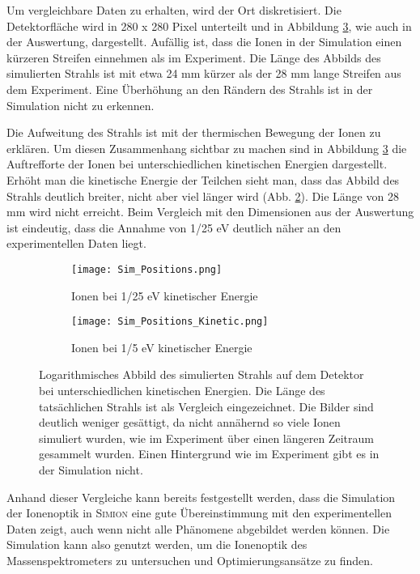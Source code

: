 Um vergleichbare Daten zu erhalten, wird der Ort diskretisiert. Die Detektorfläche wird in 280 x 280 Pixel unterteilt und in Abbildung \ref{fig:sim_pos_both}, wie auch in der Auswertung, dargestellt. Aufällig ist, dass die Ionen in der Simulation einen kürzeren Streifen einnehmen als im Experiment. Die Länge des Abbilds des simulierten Strahls ist mit etwa 24 mm kürzer als der 28 mm lange Streifen aus dem Experiment. Eine Überhöhung an den Rändern des Strahls ist in der Simulation nicht zu erkennen.

Die Aufweitung des Strahls ist mit der thermischen Bewegung der Ionen zu erklären. Um diesen Zusammenhang sichtbar zu machen sind in Abbildung \ref{fig:sim_pos_both} die Auftrefforte der Ionen bei unterschiedlichen kinetischen Energien dargestellt. Erhöht man die kinetische Energie der Teilchen sieht man, dass das Abbild des Strahls deutlich breiter, nicht aber viel länger wird (Abb. \ref{fig:sim_pos_kinetic}). Die Länge von 28 mm wird nicht erreicht. Beim Vergleich mit den Dimensionen aus der Auswertung ist eindeutig, dass die Annahme von 1/25 eV deutlich näher an den experimentellen Daten liegt. 

\begin{figure}
    \centering
    \begin{subfigure}{.43\textwidth}
        \centering
        \texttt{[image: Sim\_Positions.png]}
        \caption{Ionen bei 1/25 eV kinetischer Energie}
        \label{fig:sim_pos}
    \end{subfigure}%
    \hfill
    \begin{subfigure}{.45\textwidth}
        \centering
        \texttt{[image: Sim\_Positions\_Kinetic.png]}
        \caption{Ionen bei 1/5 eV kinetischer Energie}
        \label{fig:sim_pos_kinetic}
    \end{subfigure}
    \caption[Simuliertes Abbild des Strahls auf dem Detektor bei verschiedenen Energien]{Logarithmisches Abbild des simulierten Strahls auf dem Detektor bei unterschiedlichen kinetischen Energien. Die Länge des tatsächlichen Strahls ist als Vergleich eingezeichnet. Die Bilder sind deutlich weniger gesättigt, da nicht annähernd so viele Ionen simuliert wurden, wie im Experiment über einen längeren Zeitraum gesammelt wurden. Einen Hintergrund wie im Experiment gibt es in der Simulation nicht.}
    \label{fig:sim_pos_both}
\end{figure}

Anhand dieser Vergleiche kann bereits festgestellt werden, dass die Simulation der Ionenoptik in \textsc{Simion} eine gute Übereinstimmung mit den experimentellen Daten zeigt, auch wenn nicht alle Phänomene abgebildet werden können. Die Simulation kann also genutzt werden, um die Ionenoptik des Massenspektrometers zu untersuchen und Optimierungsansätze zu finden.

